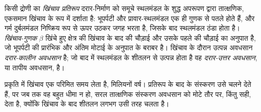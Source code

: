 \begin{definition}[खिंचाव प्रतिरूप; खिंचाव-गुणक; दरार-कालीन और दरार-उत्तर अवधसान]\label{def:b2:basins-compared:stretching}
किसी द्रोणी का \emph{खिंचाव प्रतिरूप} दरार-निर्माण को समूचे स्थलमंडल के
शुद्ध अपरूपण द्वारा तात्क्षणिक, एकसमान खिंचाव के रूप में दर्शाता है: भूपर्पटी और प्रावार-स्थलमंडल
एक ही गुणक से पतले होते हैं, और गर्म दुर्बलमंडल निष्क्रिय रूप से ऊपर उठकर
जगह भरता है, जिसके बाद स्थलमंडल ठंडा होता है। \emph{खिंचाव-गुणक}
$\beta$ खिंचे हुए क्षेत्र की खिंचाव के बाद की चौड़ाई और उसके पहले की चौड़ाई का अनुपात है,
जो भूपर्पटी की प्रारंभिक और अंतिम मोटाई के अनुपात के बराबर है। खिंचाव के
दौरान उत्पन्न अवधसान \emph{दरार-कालीन अवधसान} है; जो
बाद में स्थलमंडल के शीतलन से उत्पन्न होता है वह \emph{दरार-उत्तर
अवधसान}, या तापीय अवधसान, है।
\end{definition}

प्रकृति में खिंचाव एक परिमित समय लेता है, मिलियनों वर्ष। प्रतिरूप के बाद के संस्करण उसे
चलने देते हैं, पर जब तक वह बहुत धीमा न हो, सरल तात्क्षणिक संस्करण अवधसान को
मोटे तौर पर, किंतु सही, देता है, क्योंकि खिंचाव के बाद शीतलन लगभग उसी तरह चलता है।


